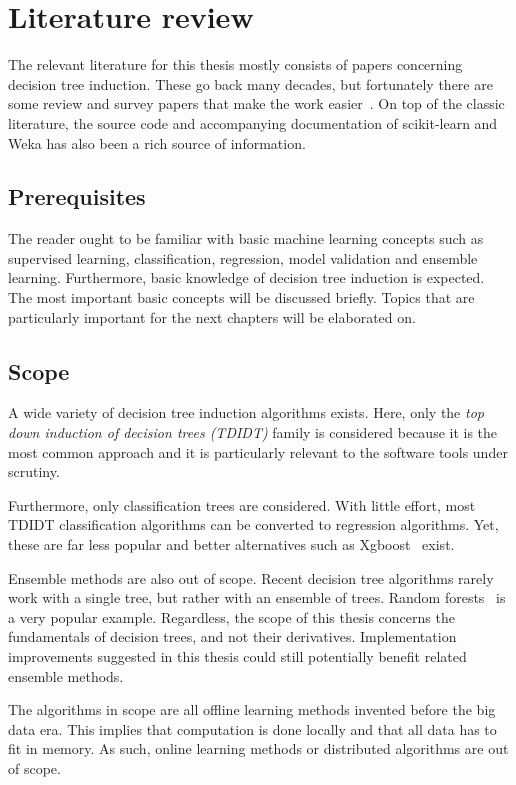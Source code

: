 \chapter{Literature review}\label{cha:literature}
The relevant literature for this thesis mostly consists of papers concerning decision tree induction. These go back many decades, but fortunately there are some review and survey papers that make the work easier~\cite{murthy1998automatic, kotsiantis2007supervised}. On top of the classic literature, the source code and accompanying documentation of scikit-learn and Weka has also been a rich source of information.

\section{Prerequisites}
The reader ought to be familiar with basic machine learning concepts such as supervised learning, classification, regression, model validation and ensemble learning. Furthermore, basic knowledge of decision tree induction is expected. The most important basic concepts will be discussed briefly. Topics that are particularly important for the next chapters will be elaborated on.

\section{Scope}
A wide variety of decision tree induction algorithms exists. Here, only the \emph{top down induction of decision trees (TDIDT)} family is considered because it is the most common approach and it is particularly relevant to the software tools under scrutiny.

Furthermore, only classification trees are considered. With little effort, most TDIDT classification algorithms can be converted to regression algorithms. Yet, these are far less popular and better alternatives such as Xgboost~\cite{xgboost} exist.

Ensemble methods are also out of scope. Recent decision tree algorithms rarely work with a single tree, but rather with an ensemble of trees. Random forests~\cite{rf} is a very popular example. Regardless, the scope of this thesis concerns the fundamentals of decision trees, and not their derivatives. Implementation improvements suggested in this thesis could still potentially benefit related ensemble methods.

The algorithms in scope are all offline learning methods invented before the big data era. This implies that computation is done locally and that all data has to fit in memory. As such, online learning methods or distributed algorithms are out of scope.

